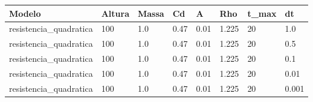 \begin{tabular}{llllllll}
\toprule
Modelo & Altura & Massa & Cd & A & Rho & t\_max & dt \\
\midrule
resistencia\_quadratica & 100 & 1.0 & 0.47 & 0.01 & 1.225 & 20 & 1.0 \\
resistencia\_quadratica & 100 & 1.0 & 0.47 & 0.01 & 1.225 & 20 & 0.5 \\
resistencia\_quadratica & 100 & 1.0 & 0.47 & 0.01 & 1.225 & 20 & 0.1 \\
resistencia\_quadratica & 100 & 1.0 & 0.47 & 0.01 & 1.225 & 20 & 0.01 \\
resistencia\_quadratica & 100 & 1.0 & 0.47 & 0.01 & 1.225 & 20 & 0.001 \\
\bottomrule
\end{tabular}
